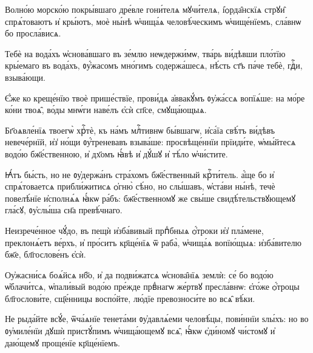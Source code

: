 \hKv Волно́ю морско́ю покры́вшаго дре́вле гони́телѧ  мꙋчи́телѧ, і҆ѻрда̑нскїѧ стрꙋи̑ спрѧ́товаютъ и҆ кры́ютъ,  моѐ ны́нѣ ѡ҆чища́ѧ человѣ́ческимъ ѡ҆чище́нїемъ, сла́внѡ  бо просла́висѧ.
%

\hKv Тебѐ на вода́хъ ѡ҆снова́вшаго въ зе́млю  неѡдержи́мѡ, тва́рь ви́дѣвши пло́тїю кры́емаго въ вода́хъ,  ᲂу҆́жасомъ мно́гимъ содержа́шесѧ, нѣ́сть ст҃ъ па́че тебѐ,  гдⷭ҇и, взыва́ющи.
%

\hKv Є҆́же ко креще́нїю твоѐ прише́ствїе, прови́дѧ  а҆ввакꙋ́мъ ᲂу҆жа́ссѧ вопїѧ́ше: на мо́ре ко́ни твоѧ̑, во́ды  мнѡ́ги наве́лъ є҆сѝ сп҃се, смꙋща́ющыѧ.
%

\hKv Бг҃оѧвле́нїѧ твоегѡ̀ хрⷭ҇тѐ, къ на́мъ  млⷭ҇тивнѡ бы́вшагѡ, и҆са́їа свѣ́тъ ви́дѣвъ невече́рнїй,  и҆з̾ но́щи ᲂу҆́треневавъ взыва́ше: просвѣще́ннїи  прїиди́те, ѡ҆мы́йтесѧ водо́ю бж҃е́ственною, и҆ дх҃омъ  ꙗ҆́вѣ и҆ дꙋ́шꙋ и҆ тѣ́ло ѡ҆чи́стите.
%

\hKv Ꙗ҆́тъ бы́сть, но не ᲂу҆держа́нъ стра́хомъ  бж҃е́ственный крⷭ҇ти́тель. а҆́ще бо и҆ спрѧ́товаетсѧ  прибли́житисѧ ѻ҆гню̀ сѣ́но, но слы́шавъ, ѡ҆ста́ви ны́нѣ,  течѐ повелѣ́нїе и҆сполнѧ́ѧ ꙗ҆́кѡ ра́бъ: бж҃е́ственномꙋ же  свы́ше свидѣ́тельствꙋющемꙋ гла́сꙋ, ᲂу҆слы́ша сн҃а  превѣ́чнаго.
%

\hKv Неизрече́нное чꙋ́до, въ пещѝ и҆зба́вивый  прпⷣбныѧ ѻ҆́троки и҆з̾ пла́мене, преклонѧ́етъ ве́рхъ, и҆  про́ситъ кр҃ще́нїѧ ѿ раба̀, ѡ҆чища́ѧ вопїю́щыѧ:  и҆зба́вителю бж҃е, бл҃гослове́нъ є҆сѝ.
%

\hKv Оу҆жасни́сѧ боѧ́йсѧ нб҃о, и҆ да подви́жатсѧ  ѡ҆снова̑нїѧ землѝ: се́ бо водо́ю   ѡ҆блачи́тсѧ, ѡ҆пали́вый водо́ю пре́жде првⷣнагѡ же́ртвꙋ  пресла́внѡ: є҆го́же ѻ҆́троцы бл҃гослови́те, сщ҃е́нницы  воспо́йте, лю́дїе превозноси́те во всѧ̑ вѣ́ки.
%

\hKv Не рыда́йте всꙋ́е, ѿча́ѧнїе тенета́ми  ᲂу҆давлѧ́еми человѣ́цы, пови́ннїи ѕлы́хъ: но во  ᲂу҆миле́нїи дꙋшѝ пристꙋ́пимъ ѡ҆чища́ющемꙋ всѧ̑, ꙗ҆́кѡ  є҆ди́номꙋ чи́стомꙋ и҆ даю́щемꙋ проще́нїе кр҃ще́нїемъ.
